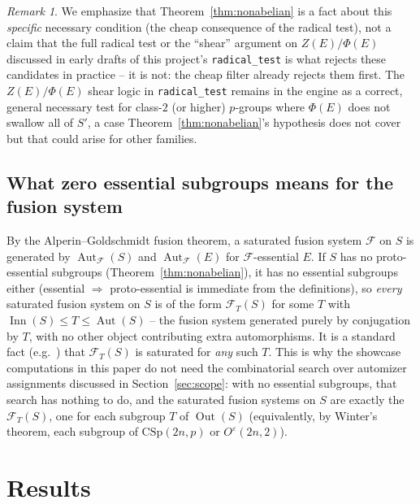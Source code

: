 \documentclass[11pt]{article}
\theoremstyle{remark}
\newtheorem*{remark}{Remark}
\begin{document}
\begin{remark}
We emphasize that Theorem~\ref{thm:nonabelian} is a fact about this
\emph{specific} necessary condition (the cheap consequence of the radical
test), not a claim that the full radical test or the ``shear'' argument on
$Z(E)/\Phi(E)$ discussed in early drafts of this project's \texttt{radical\_test}
is what rejects these candidates in practice -- it is not: the cheap filter
already rejects them first. The $Z(E)/\Phi(E)$ shear logic in
\texttt{radical\_test} remains in the engine as a correct, general
necessary test for class-$2$ (or higher) $p$-groups where $\Phi(E)$ does
not swallow all of $S'$, a case Theorem~\ref{thm:nonabelian}'s hypothesis
does not cover but that could arise for other families.
\end{remark}

\subsection{What zero essential subgroups means for the fusion system}
\label{sec:nofusion}

By the Alperin--Goldschmidt fusion theorem, a saturated fusion system
$\mathcal{F}$ on $S$ is generated by $\operatorname{Aut}_{\mathcal{F}}(S)$
and $\operatorname{Aut}_{\mathcal{F}}(E)$ for $\mathcal{F}$-essential $E$.
If $S$ has no proto-essential subgroups (Theorem~\ref{thm:nonabelian}), it
has no essential subgroups either (essential $\Rightarrow$ proto-essential
is immediate from the definitions), so \emph{every} saturated fusion system
on $S$ is of the form $\mathcal{F}_T(S)$ for some $T$ with
$\operatorname{Inn}(S) \le T \le \operatorname{Aut}(S)$ -- the fusion
system generated purely by conjugation by $T$, with no other object
contributing extra automorphisms. It is a standard fact
(e.g.\ \cite[Part I]{broto-levi-oliver}) that $\mathcal{F}_T(S)$ is
saturated for \emph{any} such $T$. This is why the showcase computations in
this paper do not need the combinatorial search over automizer assignments
discussed in Section~\ref{sec:scope}: with no essential subgroups, that
search has nothing to do, and the saturated fusion systems on $S$ are
exactly the $\mathcal{F}_T(S)$, one for each subgroup $T$ of
$\operatorname{Out}(S)$ (equivalently, by Winter's theorem, each subgroup of
$\mathrm{CSp}(2n,p)$ or $O^{\varepsilon}(2n,2)$).

\section{Results}
\label{sec:results}
\end{document}
